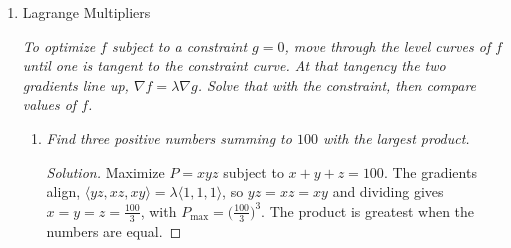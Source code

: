 \documentclass[12pt]{article}
\newenvironment{solution}
  {\renewcommand\qedsymbol{$\blacksquare$}\begin{proof}[Solution]}
  {\end{proof}}
\begin{document}
\begin{enumerate}
\begin{enumerate}
    \item \textit{Prove $\operatorname{div}(\operatorname{curl}\vec F)=0$ for any smooth $\vec F$.}

    \begin{solution}
    A pure spin field has nothing left to spread. Writing $\vec F=\langle P,Q,R\rangle$,
    \[
      \operatorname{div}(\operatorname{curl}\vec F)=(R_{yx}-Q_{zx})+(P_{zy}-R_{xy})+(Q_{xz}-P_{yz}).
    \]
    By Clairaut the mixed partials are equal, so the six terms cancel in pairs and the sum is $0$. So a curl field has no sources.
    \end{solution}

    \item \textit{Compare what divergence sees in the outflow field $\vec F=\langle x,y\rangle$ and the rotation field $\vec G=\langle-y,x\rangle$.}

    \begin{solution}
    $\operatorname{div}\vec F=2$, positive everywhere, every point a little source pushing outward. $\operatorname{div}\vec G=0$, the rotation neither spreads nor gathers. The curl reverses the roles, $\vec G$ spins and $\vec F$ does not. Divergence and curl are two independent questions, spreading and spinning, you can ask of any field.
    \end{solution}

    \end{enumerate}
\newpage

\item Lagrange Multipliers

    \textit{To optimize $f$ subject to a constraint $g=0$, move through the level curves of $f$ until one is tangent to the constraint curve. At that tangency the two gradients line up, $\nabla f=\lambda\nabla g$. Solve that with the constraint, then compare values of $f$.}

    \begin{enumerate}
    \item \textit{Find three positive numbers summing to $100$ with the largest product.}

    \begin{solution}
    Maximize $P=xyz$ subject to $x+y+z=100$. The gradients align, $\langle yz,xz,xy\rangle=\lambda\langle1,1,1\rangle$, so $yz=xz=xy$ and dividing gives $x=y=z=\tfrac{100}{3}$, with $P_{\max}=\bigl(\tfrac{100}{3}\bigr)^3$. The product is greatest when the numbers are equal.
    \end{solution}


\end{enumerate}
\end{enumerate}
\end{document}
